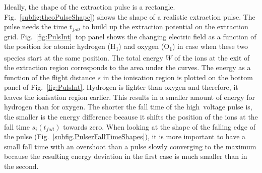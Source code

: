 	Ideally, the shape of the extraction pulse is a rectangle. Fig.~\ref{subfig:theoPulseShape}) shows the shape of a realistic extraction pulse. The pulse needs the time $t_{fall}$ to build up the extraction potential on the extraction grid. Fig.~\ref{fig:PulsInt}~top panel shows the changing electric field as a function of the position for atomic hydrogen (H\textsubscript{1}) and oxygen (O\textsubscript{1}) in case when these two species start at the same position. The total energy $W$ of the ions at the exit of the extraction region corresponds to the area under the curves. The energy as a function of the flight distance $s$ in the ionisation region is plotted on the bottom panel of Fig.~\ref{fig:PulsInt}. Hydrogen is lighter than oxygen and therefore, it leaves the ionisation region earlier. This results in a smaller amount of energy for hydrogen than for oxygen. The shorter the fall time of the high~voltage pulse is, the smaller is the energy difference because it shifts the position of the ions at the fall time $s_i(t_{fall})$ towards zero. When looking at the shape of the falling edge of the pulse (Fig.~\ref{subfig.PulserFallTimeShapes}), it is more important to have a small fall time with an overshoot than a pulse slowly converging to the maximum because the resulting energy deviation in the first case is much smaller than in the second.\\
	
